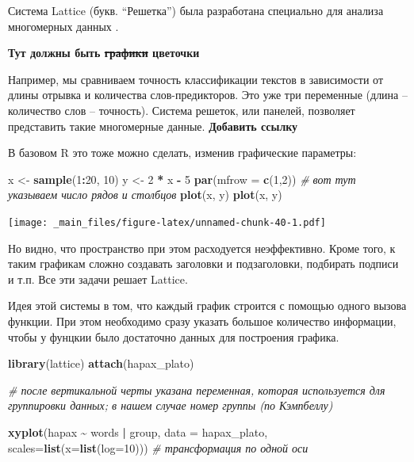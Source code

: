 \documentclass[
]{book}
\newenvironment{Shaded}{\begin{snugshade}}{\end{snugshade}}
\newcommand{\AttributeTok}[1]{\textcolor[rgb]{0.13,0.29,0.53}{#1}}
\newcommand{\CommentTok}[1]{\textcolor[rgb]{0.56,0.35,0.01}{\textit{#1}}}
\newcommand{\DecValTok}[1]{\textcolor[rgb]{0.00,0.00,0.81}{#1}}
\newcommand{\FunctionTok}[1]{\textcolor[rgb]{0.13,0.29,0.53}{\textbf{#1}}}
\newcommand{\NormalTok}[1]{#1}
\newcommand{\OtherTok}[1]{\textcolor[rgb]{0.56,0.35,0.01}{#1}}
\newcommand{\SpecialCharTok}[1]{\textcolor[rgb]{0.81,0.36,0.00}{\textbf{#1}}}
\theoremstyle{definition}
\theoremstyle{definition}
\theoremstyle{definition}
\theoremstyle{definition}
\theoremstyle{remark}
\begin{document}
Система Lattice (букв. ``Решетка'') была разработана специально для анализа многомерных данных \citep{sarkar2008}.

\textbf{Тут должны быть \st{графики} цветочки}

Например, мы сравниваем точность классификации текстов в зависимости от длины отрывка и количества слов-предикторов. Это уже три переменные (длина -- количество слов -- точность). Система решеток, или панелей, позволяет представить такие многомерные данные. \textbf{Добавить ссылку}

В базовом R это тоже можно сделать, изменив графические параметры:

\begin{Shaded}
\begin{Highlighting}[]
\NormalTok{x }\OtherTok{\textless{}{-}} \FunctionTok{sample}\NormalTok{(}\DecValTok{1}\SpecialCharTok{:}\DecValTok{20}\NormalTok{, }\DecValTok{10}\NormalTok{)}
\NormalTok{y }\OtherTok{\textless{}{-}} \DecValTok{2} \SpecialCharTok{*}\NormalTok{ x  }\SpecialCharTok{{-}} \DecValTok{5}
\FunctionTok{par}\NormalTok{(}\AttributeTok{mfrow =} \FunctionTok{c}\NormalTok{(}\DecValTok{1}\NormalTok{,}\DecValTok{2}\NormalTok{)) }\CommentTok{\# вот тут указываем число рядов и столбцов}
\FunctionTok{plot}\NormalTok{(x, y)}
\FunctionTok{plot}\NormalTok{(x, y)}
\end{Highlighting}
\end{Shaded}

\texttt{[image: \_main\_files/figure-latex/unnamed-chunk-40-1.pdf]}

Но видно, что пространство при этом расходуется неэффективно. Кроме того, к таким графикам сложно создавать заголовки и подзаголовки, подбирать подписи и т.п. Все эти задачи решает Lattice.

Идея этой системы в том, что каждый график строится с помощью одного вызова функции. При этом необходимо сразу указать большое количество информации, чтобы у фунцкии было достаточно данных для построения графика.

\begin{Shaded}
\begin{Highlighting}[]
\FunctionTok{library}\NormalTok{(lattice)}
\FunctionTok{attach}\NormalTok{(hapax\_plato)}

\CommentTok{\# после вертикальной черты указана переменная, которая используется для группировки данных; в нашем случае номер группы (по Кэмпбеллу)}

\FunctionTok{xyplot}\NormalTok{(hapax }\SpecialCharTok{\textasciitilde{}}\NormalTok{ words }\SpecialCharTok{|}\NormalTok{ group, }\AttributeTok{data =}\NormalTok{ hapax\_plato,}
       \AttributeTok{scales=}\FunctionTok{list}\NormalTok{(}\AttributeTok{x=}\FunctionTok{list}\NormalTok{(}\AttributeTok{log=}\DecValTok{10}\NormalTok{))) }\CommentTok{\# трансформация по одной оси}
\end{Highlighting}
\end{Shaded}
\end{document}
